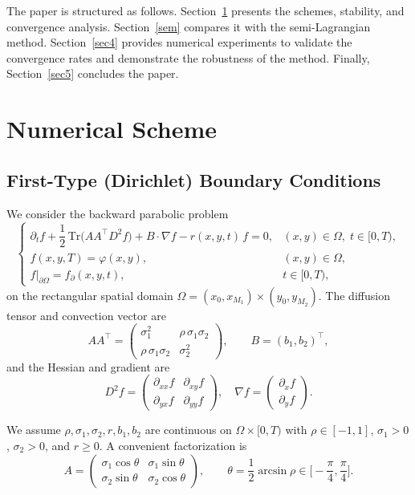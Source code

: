 \documentclass[11pt]{article}
\theoremstyle{mythm}
\theoremstyle{definition}
\begin{document}
	\medskip
	The paper is structured as follows.
	Section~\ref{sec2} presents the schemes, stability, and convergence
	analysis.
	Section~\ref{sem} compares it with the semi-Lagrangian method.
	Section~\ref{sec4} provides numerical experiments to validate the
	convergence rates and demonstrate the robustness of the method.
	Finally, Section~\ref{sec5} concludes the paper.
	\section{Numerical Scheme}
	\label{sec2}
	
	\subsection{First-Type (Dirichlet) Boundary Conditions}
	\label{subsec:first-type}
	
	We consider the backward parabolic problem
	\begin{equation}\label{eq:PDE-backward}
		\begin{cases}
			\partial_t f + \dfrac{1}{2}\,\mathrm{Tr}\big( A A^\top D^2 f \big) + B\cdot\nabla f - r(x,y,t)\,f = 0,
			& (x,y)\in\Omega,\; t\in[0,T),\\[2pt]
			f(x,y,T) = \varphi(x,y), & (x,y)\in\Omega,\\[1pt]
			f\big|_{\partial\Omega} = f_{\partial}(x,y,t), & t\in[0,T),
		\end{cases}
	\end{equation}
	on the rectangular spatial domain $\Omega=(x_0,x_{M_1})\times (y_0,y_{M_2})$.
	The diffusion tensor and convection vector are
	\[
	A A^\top =
	\begin{pmatrix}
		\sigma_1^2 & \rho\,\sigma_1\sigma_2 \\[1pt]
		\rho\,\sigma_1\sigma_2 & \sigma_2^2
	\end{pmatrix},\qquad
	B=(b_1,b_2)^\top,
	\]
	and the Hessian and gradient are
	\[
	D^2 f = 
	\begin{pmatrix} 
		\partial_{xx} f & \partial_{xy} f \\ 
		\partial_{yx} f & \partial_{yy} f 
	\end{pmatrix}, \quad 
	\nabla f = 
	\begin{pmatrix} 
		\partial_x f \\ 
		\partial_y f 
	\end{pmatrix}.
	\]
	
	We assume $\rho,\sigma_1,\sigma_2,r,b_1,b_2$ are continuous on $\Omega\times[0,T)$ with 
	$\rho\in[-1,1]$, $\sigma_1>0$, $\sigma_2>0$, and $r\ge0$.
	A convenient factorization is
	\[
	A =
	\begin{pmatrix}
		\sigma_1\cos\theta & \sigma_1\sin\theta\\[1pt]
		\sigma_2\sin\theta & \sigma_2\cos\theta
	\end{pmatrix}, \qquad
	\theta = \dfrac12 \arcsin \rho \in \Big[-\dfrac{\pi}{4}, \dfrac{\pi}{4}\Big].
	\]
	
\end{document}
